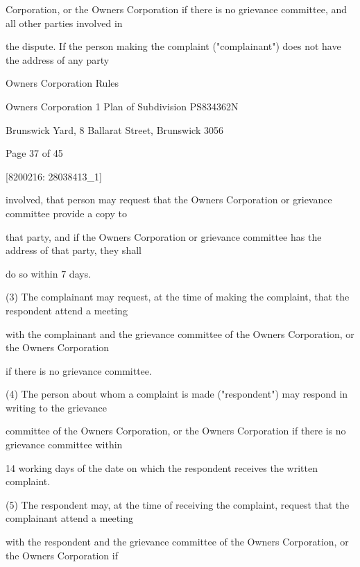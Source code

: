 \documentclass{article}
\begin{document}
{\fontsize{10.02}{1}Corporation, or the Owners Corporation if there is no grievance committee, and all other parties involved in }

{\fontsize{10.02}{1}the dispute. If the person making the complaint ("complainant") does not have the address of any party }

\newpage





{\fontsize{9}{1}Owners Corporation Rules }

{\fontsize{9}{1}Owners Corporation 1 Plan of Subdivision PS834362N }

{\fontsize{9}{1}Brunswick Yard, 8 Ballarat Street, Brunswick 3056 }


{\fontsize{9}{1}Page 37  of 45 }



{\fontsize{7.02}{1}[8200216: 28038413\_1] }

{\fontsize{10.02}{1}involved, that person may request that the Owners Corporation or grievance committee provide a copy to }

{\fontsize{10.02}{1}that party, and if the Owners Corporation or grievance committee has the address of that party, they shall }

{\fontsize{10.02}{1}do so within 7 days. }

{\fontsize{9.962}{1}(3) The complainant may request, at the time of making the complaint, that the respondent attend a meeting }

{\fontsize{10.02}{1}with the complainant and the grievance committee of the Owners Corporation, or the Owners Corporation }

{\fontsize{10.02}{1}if there is no grievance committee. }

{\fontsize{9.962}{1}(4) The person about whom a complaint is made ("respondent") may respond in writing to the grievance }

{\fontsize{10.02}{1}committee of the Owners Corporation, or the Owners Corporation if there is no grievance committee within }

{\fontsize{10.02}{1}14 working days of the date on which the respondent receives the written complaint. }

{\fontsize{9.962}{1}(5) The respondent may, at the time of receiving the complaint, request that the complainant attend a meeting }

{\fontsize{10.02}{1}with the respondent and the grievance committee of the Owners Corporation, or the Owners Corporation if }
\end{document}
